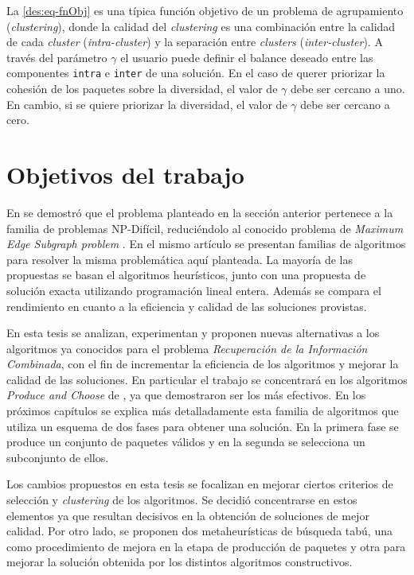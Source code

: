 La \autoref{des:eq-fnObj} es una típica función objetivo de un problema de agrupamiento ({\em clustering}), donde la calidad del {\em clustering} es una combinación entre la calidad de cada {\em cluster} ({\em intra-cluster}) y la separación entre {\em clusters} ({\em inter-cluster}). A través del parámetro $\gamma$ el usuario puede definir el balance deseado entre las componentes \texttt{intra} e \texttt{inter} de una solución. En el caso de querer priorizar la cohesión de los paquetes sobre la diversidad, el  valor de $\gamma$ debe ser cercano a uno. En cambio, si se quiere priorizar la diversidad, el valor de $\gamma$ debe ser cercano a cero.

\section{Objetivos del trabajo}
En \cite{journals/tkde/Amer-YahiaBCFMZ14} se demostró que el problema planteado en la sección anterior pertenece a la familia de problemas NP-Difícil, reduciéndolo al conocido problema de {\em Maximum Edge Subgraph problem} \cite{finding_maximum_density_subgraph}. En el mismo artículo se presentan familias de algoritmos para resolver la misma problemática aquí planteada. La mayoría de las propuestas se basan el algoritmos heurísticos, junto con una propuesta de solución exacta utilizando programación lineal entera. Además se compara el rendimiento en cuanto a la eficiencia y calidad de las soluciones provistas.

En esta tesis se analizan, experimentan y proponen nuevas alternativas a los algoritmos ya conocidos para el problema {\em Recuperación de la Información Combinada}, con el fin de incrementar la eficiencia de los algoritmos y mejorar la calidad de las soluciones. En particular el trabajo se concentrará en los algoritmos {\em Produce and Choose} de \cite{journals/tkde/Amer-YahiaBCFMZ14}, ya que demostraron ser los más efectivos. En los próximos capítulos se explica más detalladamente esta familia de algoritmos que utiliza un esquema de dos fases para obtener una solución. En la primera fase se produce un conjunto de paquetes válidos y en la segunda se selecciona un subconjunto de ellos.

Los cambios propuestos en esta tesis se focalizan en mejorar ciertos criterios de selección y {\em clustering} de los algoritmos. Se decidió concentrarse en estos elementos ya que  resultan decisivos en la obtención de soluciones de mejor calidad. Por otro lado, se proponen dos metaheurísticas de búsqueda tabú, una como procedimiento de mejora en la etapa de producción de paquetes y otra para mejorar la solución obtenida por los distintos algoritmos constructivos.

